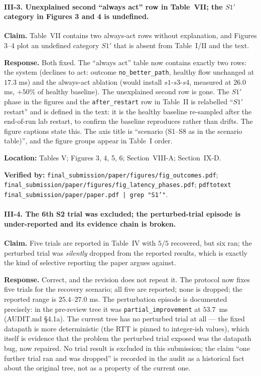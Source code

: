 \documentclass[11pt,a4paper]{article}
\begin{document}
\paragraph{III-3. Unexplained second ``always act'' row in Table~VII; the
$S1'$ category in Figures 3 and 4 is undefined.}

\textbf{Claim.} Table~VII contains two always-act rows without explanation,
and Figures 3–4 plot an undefined category $S1'$ that is absent from
Table~I/II and the text.

\textbf{Response.} Both fixed. The ``always act'' table now contains exactly
two rows: the system (declines to act: outcome \texttt{no\_better\_path},
healthy flow unchanged at $17.3$ ms) and the always-act ablation (would
install $s1$-$s3$-$s4$, measured at $26.0$ ms, $+50\%$ of healthy baseline).
The unexplained second row is gone. The $S1'$ phase in the figures and the
\texttt{after\_restart} row in Table~II is relabelled ``$S1'$ restart'' and
is defined in the text: it is the healthy baseline re-sampled after the
end-of-run lab restart, to confirm the baseline reproduces rather than drifts.
The figure captions state this. The axis title is ``scenario (S1--S8 as in
the scenario table)'', and the figure groups appear in Table~I order.

\textbf{Location:} Tables V; Figures 3, 4, 5, 6; Section~VIII-A; Section~IX-D.

\textbf{Verified by:} \texttt{final\_submission/paper/figures/fig\_outcomes.pdf};
\texttt{final\_submission/paper/figures/fig\_latency\_phases.pdf};
\texttt{pdftotext final\_submission/paper/paper.pdf | grep "S1'"}.

\paragraph{III-4. The 6th S2 trial was excluded; the perturbed-trial episode
is under-reported and its evidence chain is broken.}

\textbf{Claim.} Five trials are reported in Table~IV with $5/5$ recovered,
but six ran; the perturbed trial was \emph{silently} dropped from the
reported results, which is exactly the kind of selective reporting the paper
argues against.

\textbf{Response.} Correct, and the revision does not repeat it. The
protocol now fixes five trials for the recovery scenario; all five are
reported; none is dropped; the reported range is $25.4$--$27.0$ ms. The
perturbation episode is documented precisely: in the pre-review tree it was
\texttt{partial\_improvement} at $53.7$~ms (AUDIT.md §4.1a). The current tree
has no perturbed trial at all --- the fixed datapath is more deterministic
(the RTT is pinned to integer-ish values), which itself is evidence that the
problem the perturbed trial exposed was the datapath bug, now repaired. No
trial result is excluded in this submission; the claim ``one further trial
ran and was dropped'' is recorded in the audit as a historical fact about the
original tree, not as a property of the current one.
\end{document}

